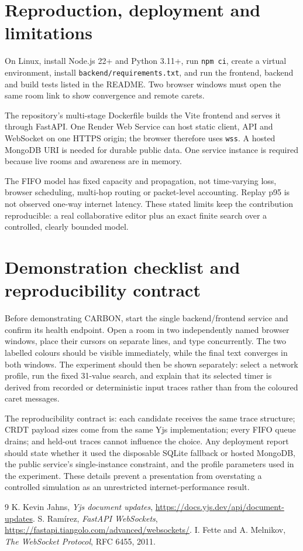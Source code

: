 \documentclass[10pt]{article}
\begin{document}
\clearpage
\section{Reproduction, deployment and limitations}
On Linux, install Node.js 22+ and Python 3.11+, run \texttt{npm ci}, create a virtual environment, install \texttt{backend/requirements.txt}, and run the frontend, backend and build tests listed in the README. Two browser windows must open the same room link to show convergence and remote carets.

The repository's multi-stage Dockerfile builds the Vite frontend and serves it through FastAPI. One Render Web Service can host static client, API and WebSocket on one HTTPS origin; the browser therefore uses \texttt{wss}. A hosted MongoDB URI is needed for durable public data. One service instance is required because live rooms and awareness are in memory.

The FIFO model has fixed capacity and propagation, not time-varying loss, browser scheduling, multi-hop routing or packet-level accounting. Replay p95 is not observed one-way internet latency. These stated limits keep the contribution reproducible: a real collaborative editor plus an exact finite search over a controlled, clearly bounded model.

\clearpage
\appendix
\section{Demonstration checklist and reproducibility contract}
Before demonstrating CARBON, start the single backend/frontend service and confirm its health endpoint. Open a room in two independently named browser windows, place their cursors on separate lines, and type concurrently. The two labelled colours should be visible immediately, while the final text converges in both windows. The experiment should then be shown separately: select a network profile, run the fixed 31-value search, and explain that its selected timer is derived from recorded or deterministic input traces rather than from the coloured caret messages.

The reproducibility contract is: each candidate receives the same trace structure; CRDT payload sizes come from the same Yjs implementation; every FIFO queue drains; and held-out traces cannot influence the choice. Any deployment report should state whether it used the disposable SQLite fallback or hosted MongoDB, the public service's single-instance constraint, and the profile parameters used in the experiment. These details prevent a presentation from overstating a controlled simulation as an unrestricted internet-performance result.

\begin{thebibliography}{9}
 K. Kevin Jahns, \emph{Yjs document updates}, \url{https://docs.yjs.dev/api/document-updates}.
 S. Ram\'irez, \emph{FastAPI WebSockets}, \url{https://fastapi.tiangolo.com/advanced/websockets/}.
 I. Fette and A. Melnikov, \emph{The WebSocket Protocol}, RFC 6455, 2011.
\end{thebibliography}
\end{document}

